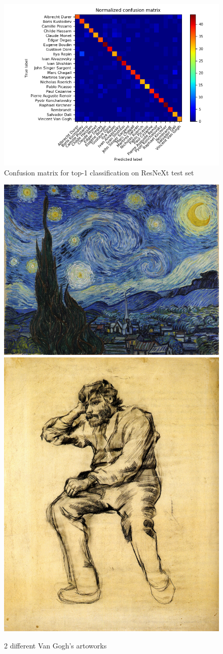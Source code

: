 \documentclass{article}
\begin{document}
\begin{figure}
	\centering
	\includegraphics[width=0.8\linewidth]{graphs/confusion}
	\caption{Confusion matrix for top-1 classification on ResNeXt test set}
	\label{fig:confusion}
\end{figure}


\begin{figure}[htp]
	
	\centering
	\includegraphics[width=.5\textwidth]{image/1280px-Van_Gogh_-_Starry_Night_-_Google_Art_Project}\hfill
	\includegraphics[height=.5\textwidth]{image/vincent-van-gogh_seated-man-with-a-beard-1886-1}
	
	\caption{2 different Van Gogh's artoworks}
	\label{fig:vangogh}
	
\end{figure}
\end{document}
